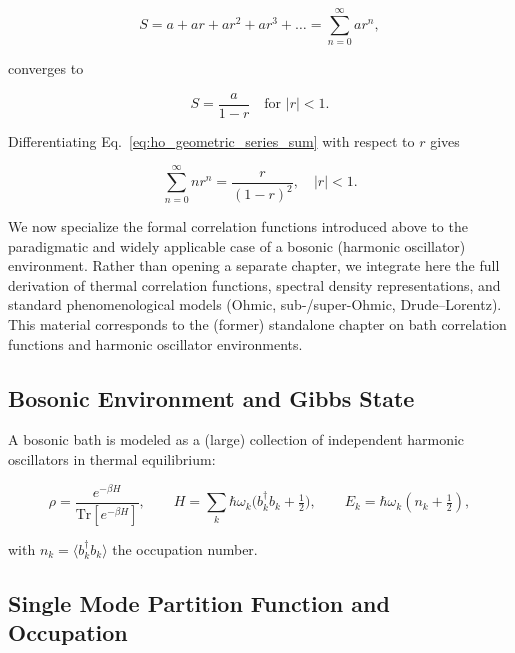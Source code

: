 \begin{equation} \label{eq:ho_infinite_geometric_series}
	S = a + ar + ar^2 + ar^3 + \dots = \sum_{n=0}^{\infty} ar^n,
\end{equation}

\noindent
converges to

\begin{equation} \label{eq:ho_geometric_series_sum}
	S = \frac{a}{1-r} \quad \text{for } |r|<1.
\end{equation}

\noindent
Differentiating Eq.~\eqref{eq:ho_geometric_series_sum} with respect to $r$ gives

\begin{equation} \label{eq:ho_derivation_geometric_sum}
	\sum_{n=0}^{\infty} n r^n = \frac{r}{(1-r)^2}, \quad |r|<1.
\end{equation}



\noindent
We now specialize the formal correlation functions introduced above to the paradigmatic and widely applicable case of a bosonic (harmonic oscillator) environment. Rather than opening a separate chapter, we integrate here the full derivation of thermal correlation functions, spectral density representations, and standard phenomenological models (Ohmic, sub-/super-Ohmic, Drude--Lorentz). This material corresponds to the (former) standalone chapter on bath correlation functions and harmonic oscillator environments.


\subsection{Bosonic Environment and Gibbs State}
\label{subsec:bosonic_environment_gibbs}

\noindent
A bosonic bath is modeled as a (large) collection of independent harmonic oscillators in thermal equilibrium:

\begin{equation} \label{eq:ho_gibbs_state}
	\rho = \frac{e^{-\beta H}}{\mathrm{Tr}[e^{-\beta H}]}, \qquad H=\sum_k \hbar \omega_k \Big(b_k^{\dagger} b_k + \tfrac{1}{2}\Big), \qquad E_k = \hbar \omega_k (n_k + \tfrac{1}{2}),
\end{equation}

\noindent
with $n_k = \langle b_k^{\dagger} b_k \rangle$ the occupation number.


\subsection{Single Mode Partition Function and Occupation}
\label{subsec:single_mode}

